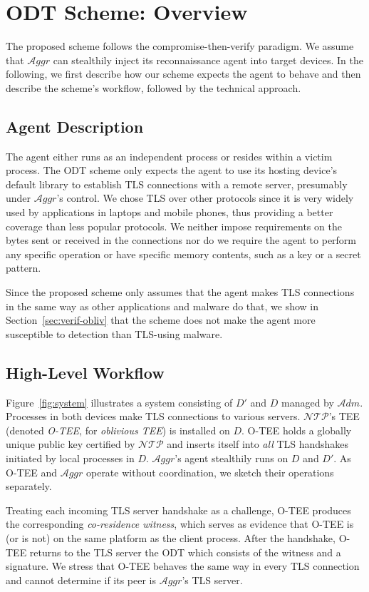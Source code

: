 \documentclass[letterpaper,twocolumn,10pt]{article}
\newcommand{\T}{\ensuremath{\mathcal{A}ggr}\xspace}
\newcommand{\N}{\ensuremath{\mathcal{N\!T}\mathcal{\!P}}\xspace}
\newcommand{\ADM}{\ensuremath{\mathcal{A}dm}\xspace}
\newcommand{\dn}{\ensuremath{D}\xspace}
\newcommand{\da}{\ensuremath{D'}\xspace}
\begin{document}
\section{ODT Scheme: Overview}
\label{sec:const}
The proposed scheme follows the compromise-then-verify paradigm. We assume that \T can stealthily inject its
reconnaissance agent into target devices.
In the following, we first describe how
our scheme expects the agent to behave and then describe the scheme's workflow, followed by the technical approach.

\subsection{Agent Description}
The agent either runs as an independent process or resides within a victim process. The ODT scheme only expects the
agent to use its hosting device's default library to establish TLS connections with a remote server, presumably
under \T's control. We chose TLS over other protocols since it is very widely used by applications in laptops and mobile phones, thus providing a better coverage than less popular protocols.
We neither impose requirements on the bytes sent or received in the connections nor do we require the agent
to perform any specific operation or have specific memory contents, such as a key or a secret pattern.

Since the proposed scheme only assumes that the agent makes TLS connections in the same way as other
applications and malware do that, we show in Section~\ref{sec:verif-obliv} that the scheme does not
make the agent more susceptible to detection than TLS-using malware.


\subsection{High-Level Workflow}
Figure~\ref{fig:system} illustrates a system consisting of \da and \dn managed by \ADM. Processes in both devices
make TLS connections to various servers. \N's TEE (denoted \emph{O-TEE}, for \emph{oblivious TEE}) is installed on \dn.
O-TEE holds a globally unique public key certified by \N and inserts itself into \emph{all} TLS handshakes
initiated by local processes in \dn.  \T's agent stealthily runs on \dn and \da. As O-TEE and \T operate without
coordination, we sketch their operations separately.

Treating each incoming TLS server handshake as a challenge,
O-TEE produces the corresponding \emph{co-residence witness}, which serves as evidence that O-TEE is (or is not)
on the same platform as the client process. After the handshake, O-TEE returns to the TLS server the ODT which consists
of the witness and a signature. We stress that O-TEE behaves the same way in every TLS connection and cannot
determine if its peer is \T's TLS server.
\end{document}
